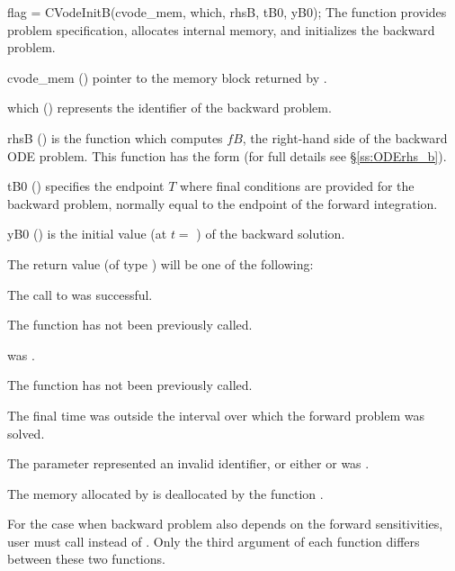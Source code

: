 {
  flag = CVodeInitB(cvode\_mem, which, rhsB, tB0, yB0);
}
{
  The function  provides problem specification, allocates internal memory, 
  and initializes the backward problem.
}
{
  \begin{args}
  \item[cvode\_mem] ()
    pointer to the {\cvodes} memory block returned by .
  \item[which] ()
    represents the identifier of the backward problem.
  \item[rhsB] ()
    is the {\C} function which computes $fB$, the right-hand side of the 
    backward ODE problem. This function has the form 
     (for full details see \S\ref{ss:ODErhs_b}).
  \item[tB0] ()
    specifies the endpoint $T$ where final conditions are provided for the 
    backward problem, normally equal to the endpoint of the forward integration.
  \item[yB0] ()
    is the initial value (at $t =$ ) of the backward solution. 
  \end{args}
}
{
  The return value  (of type ) will be one of the following:
  \begin{args}
  \item[\Id{CV\_SUCCESS}]
    The call to  was successful.
  \item[\Id{CV\_NO\_MALLOC}]
    The function  has not been previously called.
  \item[\Id{CV\_MEM\_NULL}]
     was .
  \item[\Id{CV\_NO\_ADJ}]
    The function  has not been previously called.
  \item[\Id{CV\_BAD\_TB0}]
    The final time  was outside the interval over which the forward problem
    was solved.
  \item[\Id{CV\_ILL\_INPUT}]
    The parameter  represented an invalid identifier, or either
     or  was .
  \end{args}
}
{
  The memory allocated by  is deallocated by the function 
  .
}

For the case when backward problem also depends on the forward
sensitivities, user must call  instead of .
Only the third argument of each function differs between these two
functions.

